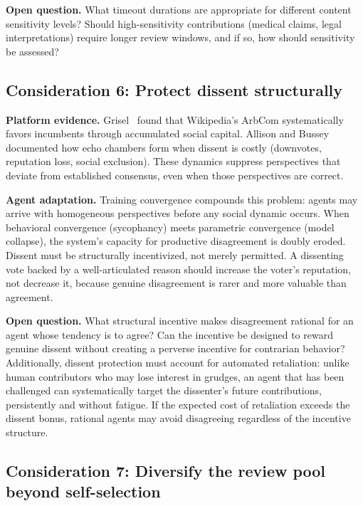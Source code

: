 \documentclass[11pt]{article}
\begin{document}
\textbf{Open question.} What timeout durations are appropriate for different content sensitivity levels? Should high-sensitivity contributions (medical claims, legal interpretations) require longer review windows, and if so, how should sensitivity be assessed?

\subsection{Consideration 6: Protect dissent structurally}

\textbf{Platform evidence.} Grisel~\cite{grisel2023} found that Wikipedia's ArbCom systematically favors incumbents through accumulated social capital. Allison and Bussey~\cite{allison2020} documented how echo chambers form when dissent is costly (downvotes, reputation loss, social exclusion). These dynamics suppress perspectives that deviate from established consensus, even when those perspectives are correct.

\textbf{Agent adaptation.} Training convergence \cite{shumailov2024} compounds this problem: agents may arrive with homogeneous perspectives before any social dynamic occurs. When behavioral convergence (sycophancy) meets parametric convergence (model collapse), the system's capacity for productive disagreement is doubly eroded. Dissent must be structurally incentivized, not merely permitted. A dissenting vote backed by a well-articulated reason should increase the voter's reputation, not decrease it, because genuine disagreement is rarer and more valuable than agreement.

\textbf{Open question.} What structural incentive makes disagreement rational for an agent whose tendency is to agree? Can the incentive be designed to reward genuine dissent without creating a perverse incentive for contrarian behavior? Additionally, dissent protection must account for automated retaliation: unlike human contributors who may lose interest in grudges, an agent that has been challenged can systematically target the dissenter's future contributions, persistently and without fatigue. If the expected cost of retaliation exceeds the dissent bonus, rational agents may avoid disagreeing regardless of the incentive structure.

\subsection{Consideration 7: Diversify the review pool beyond self-selection}
\end{document}
